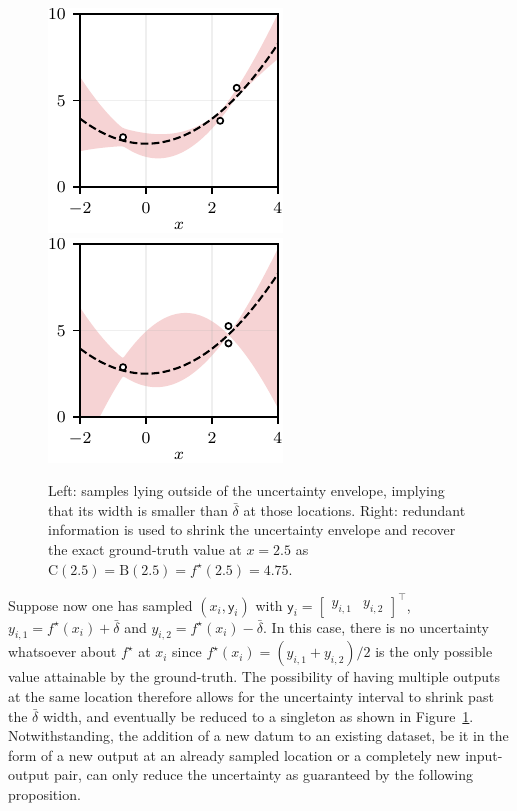 \begin{figure}[b]
	\centering
	\includegraphics{../images/chap2_ex_opt_bounds_samp_loc.pdf} \hspace{3pt}
	\includegraphics{../images/chap2_ex_opt_bounds_samp_loc2.pdf} \hspace{0pt}
	\caption{Left: samples lying outside of the uncertainty envelope, implying that its width is smaller than $\bar \delta$ at those locations. Right: redundant information is used to shrink the uncertainty envelope and recover the exact ground-truth value at $x=2.5$ as $\text{C}(2.5) = \text{B}(2.5) = f^\star(2.5)=4.75$.}
	\label{fig.ex2_opt_bounds}
\end{figure}


Suppose now one has sampled $(x_i,\mathsf{y}_i)$ with $\mathsf{y}_i = \begin{bmatrix} y_{i,1} & y_{i,2} \end{bmatrix}^\top$, $y_{i,1} = f^\star(x_i) + \bar \delta$ and $y_{i,2} = f^\star(x_i) - \bar \delta$. In this case, there is no uncertainty whatsoever about $f^\star$ at $x_i$ since $f^\star(x_i) = (y_{i,1} + y_{i,2})/2$ is the only possible value attainable by the ground-truth. The possibility of having multiple outputs at the same location therefore allows for the uncertainty interval to shrink past the $\bar \delta$ width, and eventually be reduced to a singleton as shown in Figure~\ref{fig.ex2_opt_bounds}. Notwithstanding, the addition of a new datum to an existing dataset, be it in the form of a new output at an already sampled location or a completely new input-output pair, can only reduce the uncertainty as guaranteed by the following proposition.

